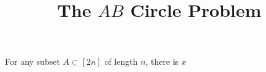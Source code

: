 \documentclass{article}
\title{The $AB$ Circle Problem}
\begin{document}
    \begin{theorem}
        For any subset $A \subset [2n]$ of length $n$, there is $x$
    \end{theorem}
\end{document}
